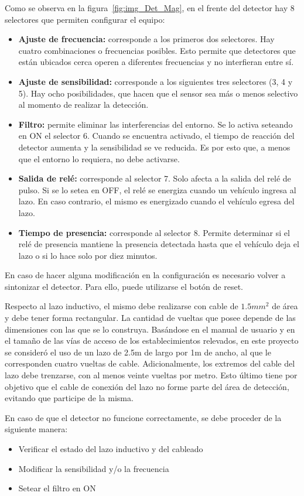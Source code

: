 Como se observa en la figura~\ref{fig:img_Det_Mag}, en el frente del detector hay 8 selectores que permiten configurar el equipo:
\begin{itemize}
	\item \textbf{Ajuste de frecuencia:} corresponde a los primeros dos selectores. Hay cuatro combinaciones o frecuencias posibles. Esto permite que detectores que están ubicados cerca operen a diferentes frecuencias y no interfieran entre sí.
	\item \textbf{Ajuste de sensibilidad:} corresponde a los siguientes tres selectores (3, 4 y 5). Hay ocho posibilidades, que hacen que el sensor sea más o menos selectivo al momento de realizar la detección.
	\item \textbf{Filtro:} permite eliminar las interferencias del entorno. Se lo activa seteando en ON el selector 6. Cuando se encuentra activado, el tiempo de reacción del detector aumenta y la sensibilidad se ve reducida. Es por esto que, a menos que el entorno lo requiera, no debe activarse.
	\item \textbf{Salida de relé:} corresponde al selector 7. Solo afecta a la salida del relé de pulso. Si se lo setea en OFF, el relé se energiza cuando un vehículo ingresa al lazo. En caso contrario, el mismo es energizado cuando el vehículo egresa del lazo. 
	\item \textbf{Tiempo de presencia:} corresponde al selector 8. Permite determinar si el relé de presencia mantiene la presencia detectada hasta que el vehículo deja el lazo o si lo hace solo por diez minutos.
\end{itemize}

En caso de hacer alguna modificación en la configuración es necesario volver a sintonizar el detector. Para ello, puede utilizarse el botón de reset.

Respecto al lazo inductivo, el mismo debe realizarse con cable de $1.5mm^{2}$ de área y debe tener forma rectangular. La cantidad de vueltas que posee depende de las dimensiones con las que se lo construya. Basándose en el manual de usuario y en el tamaño de las vías de acceso de los establecimientos relevados, en este proyecto se consideró el uso de un lazo de 2.5m de largo por 1m de ancho, al que le corresponden cuatro vueltas de cable. Adicionalmente, los extremos del cable del lazo debe trenzarse, con al menos veinte vueltas por metro. Esto último tiene por objetivo que el cable de conexión del lazo no forme parte del área de detección, evitando que participe de la misma.

En caso de que el detector no funcione correctamente, se debe proceder de la siguiente manera:
\begin{itemize}
	\item Verificar el estado del lazo inductivo y del cableado
	\item Modificar la sensibilidad y/o la frecuencia
	\item Setear el filtro en ON
\end{itemize}









